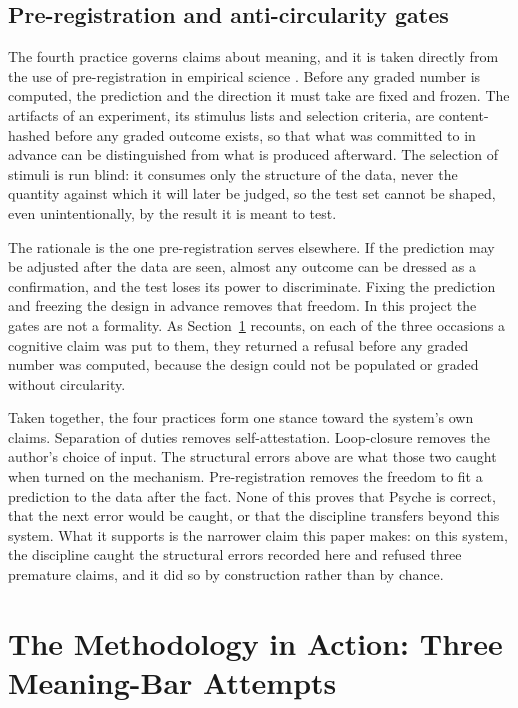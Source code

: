 \documentclass[11pt]{article}
\begin{document}
\subsection{Pre-registration and anti-circularity gates}

The fourth practice governs claims about meaning, and it is taken directly from the use
of pre-registration in empirical science \citep{nosek2018preregistration}. Before any
graded number is computed, the prediction and the direction it must take are fixed and
frozen. The artifacts of an experiment, its stimulus lists and selection criteria, are
content-hashed before any graded outcome exists, so that what was committed to in
advance can be distinguished from what is produced afterward. The selection of stimuli
is run blind: it consumes only the structure of the data, never the quantity against
which it will later be judged, so the test set cannot be shaped, even unintentionally,
by the result it is meant to test.

The rationale is the one pre-registration serves elsewhere. If the prediction may be
adjusted after the data are seen, almost any outcome can be dressed as a confirmation,
and the test loses its power to discriminate. Fixing the prediction and freezing the
design in advance removes that freedom. In this project the gates are not a formality.
As Section~\ref{sec:attempts} recounts, on each of the three occasions a cognitive claim was put
to them, they returned a refusal before any graded number was computed, because the
design could not be populated or graded without circularity.

Taken together, the four practices form one stance toward the system's own claims.
Separation of duties removes self-attestation. Loop-closure removes the author's choice
of input. The structural errors above are what those two caught when turned on the
mechanism. Pre-registration removes the freedom to fit a prediction to the data after
the fact. None of this proves that Psyche is correct, that the next error would be
caught, or that the discipline transfers beyond this system. What it supports is the
narrower claim this paper makes: on this system, the discipline caught the structural
errors recorded here and refused three premature claims, and it did so by construction
rather than by chance.

\section{The Methodology in Action: Three Meaning-Bar Attempts}\label{sec:attempts}
\end{document}
